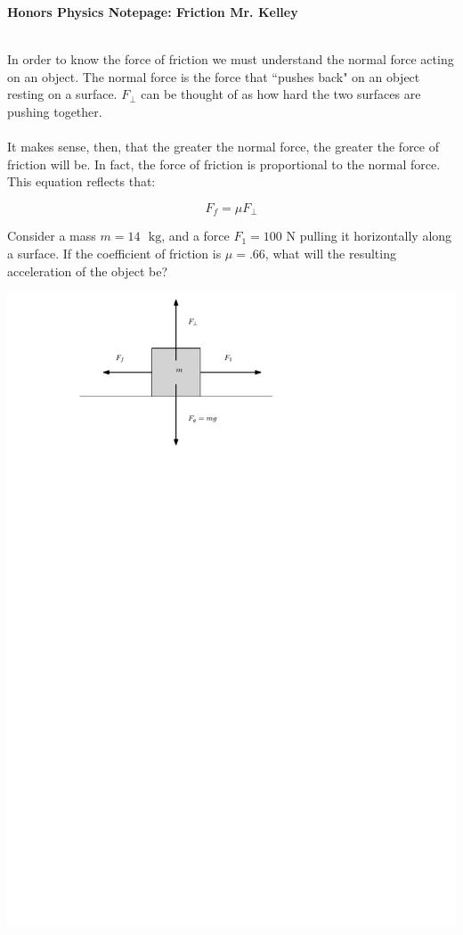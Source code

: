 \documentclass[12pt]{report}
\newcommand{\kg}{\mbox{kg}}
\begin{document}
{\bf{Honors Physics} \hfill Notepage: Friction \hfill {Mr. Kelley}} \\ \\

\vspace{1cm}

\hfill \parbox{12cm}{In order to know the force of friction we must understand the normal force acting on an object.  The normal force is the force that ``pushes back" on an object resting on a surface.  $F_\bot$ can be thought of as how hard the two surfaces are pushing together. \\ \\ It makes sense, then, that the greater the normal force, the greater the force of friction will be.  In fact, the force of friction is proportional to the normal force.  This equation reflects that:} \hspace{4cm}
$$ F_f = \mu F_\bot$$

\vspace{.75cm}

\hfill \parbox{14cm}{Consider a mass $m=14 \mbox{ }\kg$, and a force $F_1 = 100$ N pulling it horizontally along a surface.  If the coefficient of friction is $\mu = .66$, what will the resulting acceleration of the object be?} \hspace{3cm}

\vspace{.75cm}

\hfill \includegraphics{box1} \hfill \mbox{}
\end{document}
